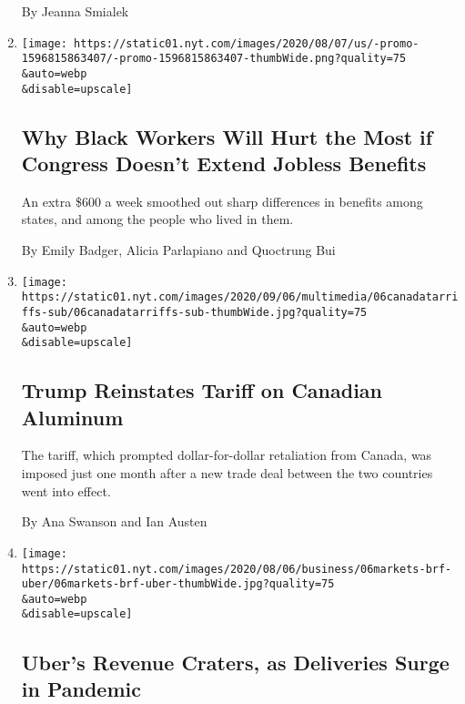 \begin{enumerate}
  By Jeanna Smialek
\item
  \href{/2020/08/07/upshot/unemployment-benefits-racial-disparity.html}{}

  \texttt{[image: https://static01.nyt.com/images/2020/08/07/us/-promo-1596815863407/-promo-1596815863407-thumbWide.png?quality=75\\\&auto=webp\\\&disable=upscale]}

  \hypertarget{why-black-workers-will-hurt-the-most-if-congress-doesnt-extend-jobless-benefits}{%
  \subsection{Why Black Workers Will Hurt the Most if Congress Doesn't
  Extend Jobless
  Benefits}\label{why-black-workers-will-hurt-the-most-if-congress-doesnt-extend-jobless-benefits}}

  An extra \$600 a week smoothed out sharp differences in benefits among
  states, and among the people who lived in them.

  By Emily Badger, Alicia Parlapiano and Quoctrung Bui
\item
  \href{/2020/08/06/business/economy/trump-canadian-aluminum-tariffs.html}{}

  \texttt{[image: https://static01.nyt.com/images/2020/09/06/multimedia/06canadatarriffs-sub/06canadatarriffs-sub-thumbWide.jpg?quality=75\\\&auto=webp\\\&disable=upscale]}

  \hypertarget{trump-reinstates-tariff-on-canadian-aluminum}{%
  \subsection{Trump Reinstates Tariff on Canadian
  Aluminum}\label{trump-reinstates-tariff-on-canadian-aluminum}}

  The tariff, which prompted dollar-for-dollar retaliation from Canada,
  was imposed just one month after a new trade deal between the two
  countries went into effect.

  By Ana Swanson and Ian Austen
\item
  \href{/2020/08/06/technology/uber-ride-hailing-delivery-coronavirus.html}{}

  \texttt{[image: https://static01.nyt.com/images/2020/08/06/business/06markets-brf-uber/06markets-brf-uber-thumbWide.jpg?quality=75\\\&auto=webp\\\&disable=upscale]}

  \hypertarget{ubers-revenue-craters-as-deliveries-surge-in-pandemic}{%
  \subsection{Uber's Revenue Craters, as Deliveries Surge in
  Pandemic}\label{ubers-revenue-craters-as-deliveries-surge-in-pandemic}}


\end{enumerate}
